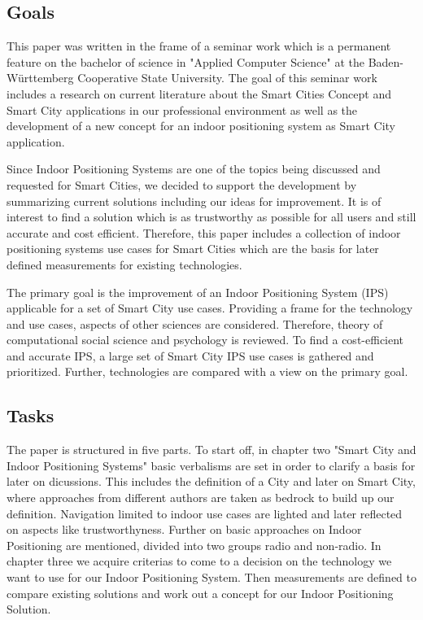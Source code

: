 \subsection{Goals}
This paper was written in the frame of a seminar work which is a permanent feature on the bachelor of science in "Applied Computer Science" at the Baden-Württemberg Cooperative State University. The goal of this seminar work includes a research on current literature about the Smart Cities Concept and Smart City applications in our professional environment as well as the development of a new concept for an indoor positioning system as Smart City application.

Since Indoor Positioning Systems are one of the topics being discussed and requested for Smart Cities, we decided to support the development by summarizing current solutions including our ideas for improvement. It is of interest to find a solution which is as trustworthy as possible for all users and still accurate and cost efficient. Therefore, this paper includes a collection of indoor positioning systems use cases for Smart Cities which are the basis for later defined measurements for existing technologies.

The primary goal is the improvement of an Indoor Positioning System (IPS) applicable for a set of Smart City use cases. Providing a frame for the technology and use cases, aspects of other sciences are considered. Therefore, theory of computational social science and psychology is reviewed. To find a cost-efficient and accurate IPS, a large set of Smart City IPS use cases is gathered and prioritized. Further, technologies are compared with a view on the primary goal. 

\subsection{Tasks}
The paper is structured in five parts. To start off, in chapter two "Smart City and Indoor Positioning Systems" basic verbalisms are set in order to clarify a basis for later on dicussions. This includes the definition of a City and later on Smart City, where approaches from different authors are taken as bedrock to build up our definition. Navigation limited to indoor use cases are lighted and later reflected on aspects like trustworthyness. Further on basic approaches on Indoor Positioning are mentioned, divided into two groups radio and non-radio. In chapter three we acquire criterias to come to a decision on the technology we want to use for our Indoor Positioning System. Then measurements are defined to compare existing solutions and work out a concept for our Indoor Positioning Solution.

\pagebreak

